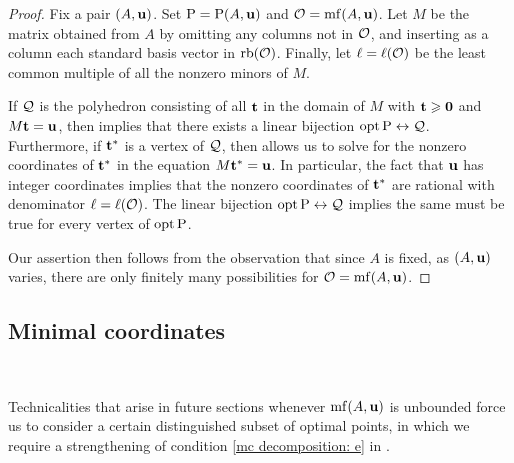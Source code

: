 \documentclass[11pt]{amsart}
\begin{document}
\begin{proof}

Fix a pair $(A, \mathbf{u})$. Set $\mathrm{P} = \mathrm{P}(A, \mathbf{u})$ and $\mathcal{O} = \operatorname{mf}(A, \mathbf{u})$.  Let $M$ be the matrix obtained from $A$ by omitting any columns not in $\mathcal{O}$, and inserting as a column each standard basis vector in $\operatorname{rb}(\mathcal{O})$.  Finally, let $\ell = \ell(\mathcal{O})$ be the least common multiple of all the nonzero minors of $M$.

If $\mathcal{Q}$ is the polyhedron consisting of all $\mathbf{t}$ in the domain of $M$ with $\mathbf{t} \geqslant \mathbf{0}$ and $M \mathbf{t} = \mathbf{u}$, then  implies that there exists a linear bijection $\operatorname{opt} \mathrm{P} 
\leftrightarrow \mathcal{Q}$.  Furthermore, if $\mathbf{t}^{\ast}$ is a vertex of $\mathcal{Q}$, then  allows us to solve for the nonzero coordinates of $\mathbf{t}^{\ast}$ in the equation $M \mathbf{t}^{\ast} = \mathbf{u}$.  In particular, the fact that $\mathbf{u}$ has integer coordinates implies that the nonzero coordinates of $\mathbf{t}^{\ast}$ are rational with denominator $\ell = \ell(\mathcal{O})$.  The linear bijection $\operatorname{opt} \mathrm{P} \leftrightarrow \mathcal{Q}$ implies the same must be true for every vertex of $\operatorname{opt} \mathrm{P}$.

Our assertion then follows from the observation that since $A$ is fixed, as $(A, \mathbf{u})$ varies, there are only finitely many possibilities for $\mathcal{O} = \operatorname{mf}(A, \mathbf{u})$.
\end{proof}


\subsection{Minimal coordinates}

\ 



Technicalities that arise in future sections whenever $\operatorname{mf}(A, \mathbf{u})$ is unbounded force us to consider a certain distinguished subset of optimal points, in which we require a strengthening of condition \eqref{mc decomposition: e} in .
\end{document}

